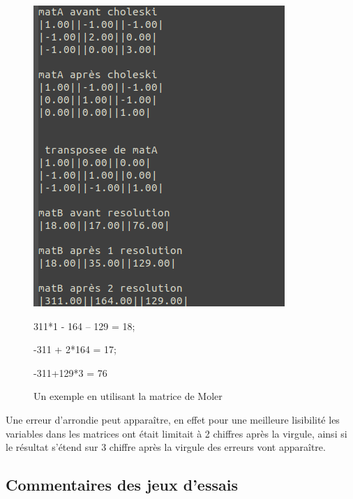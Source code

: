 \documentclass[12pt]{article}
\begin{document}
\newpage
\begin{figure}[H]
  \centering
    \begin{minipage}{0.6\textwidth}
      \centering
      \includegraphics[width=1\linewidth]{img/choleskiPreuveAlea}
      \caption{Un exemple en utilisant la matrice de Moler}\label{Img_choleskiPreuveAlea}
    \end{minipage}\hfill
    \begin{minipage}{0.3\textwidth}
      311*1 - 164 – 129 = 18;
      
      -311 + 2*164 = 17;
      
      -311+129*3 = 76
      \end{minipage}
\end{figure}

Une erreur d'arrondie peut apparaître, en effet pour une meilleure lisibilité les variables dans les matrices ont était limitait à 2 chiffres après la virgule, ainsi si le résultat s'étend sur 3 chiffre après la virgule des erreurs vont apparaître. 

\subsection{Commentaires des jeux d'essais}
\end{document}
